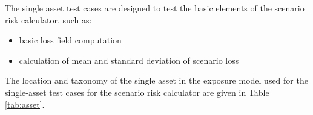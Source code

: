 The single asset test cases are designed to test the basic elements of the scenario risk calculator, such as:

\begin{itemize}
\item basic loss field computation
\item calculation of mean and standard deviation of scenario loss
\end{itemize}



The location and taxonomy of the single asset in the exposure model used for the single-asset test cases for the scenario risk calculator are given in Table \ref{tab:asset}.

